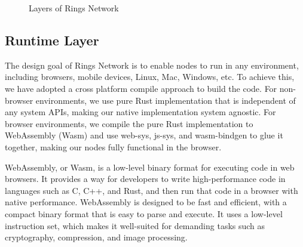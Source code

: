 \documentclass[twocolumn]{article}
\begin{document}
\begin{figure}[htbp]
\centering
{}
\caption{Layers of Rings Network}
\end{figure}





\subsection{Runtime Layer}

The design goal of Rings Network is to enable nodes to run in any environment, including browsers, mobile devices, Linux, Mac, Windows, etc. To achieve this, we have adopted a cross platform compile approach to build the code. For non-browser environments, we use pure Rust implementation that is independent of any system APIs, making our native implementation system agnostic. For browser environments, we compile the pure Rust implementation to WebAssembly (Wasm) and use web-sys, js-sys, and wasm-bindgen to glue it together, making our nodes fully functional in the browser.


WebAssembly, or Wasm, is a low-level binary format for executing code in web browsers. It provides a way for developers to write high-performance code in languages such as C, C++, and Rust, and then run that code in a browser with native performance. WebAssembly is designed to be fast and efficient, with a compact binary format that is easy to parse and execute. It uses a low-level instruction set, which makes it well-suited for demanding tasks such as cryptography, compression, and image processing.
\end{document}
